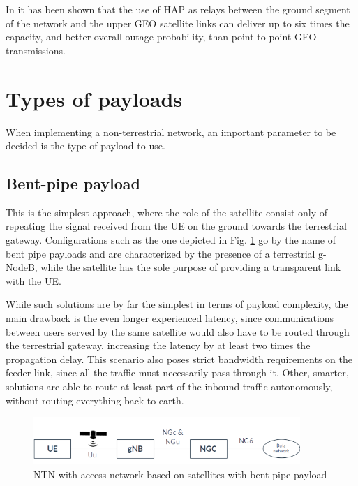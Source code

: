 In \cite{potential-multilayered-nierarchical-ntn-wang} it has been shown that the use of \ac{HAP} as relays between the ground segment of the network and the upper \ac{GEO} satellite links can deliver up to six times the capacity, and better overall outage probability, than point-to-point \ac{GEO} transmissions.


\section{Types of payloads}
When implementing a non-terrestrial network, an important parameter to be decided is the type of payload to use.

\subsection{Bent-pipe payload}
\label{sec:bent-pipe-payload}
This is the simplest approach, where the role of the satellite consist only of  repeating the signal received from the \ac{UE} on the ground towards the terrestrial gateway. Configurations such as the one depicted in Fig. \ref{fig:ntn-bent-pipe} go by the name of bent pipe payloads and are characterized by the presence of a terrestrial g-NodeB, while the satellite has the sole purpose of providing a transparent link with the \ac{UE}.

While such solutions are by far the simplest in terms of payload complexity, the main drawback is the even longer experienced latency, since communications between users served by the same satellite would also have to be routed through the terrestrial gateway, increasing the latency by at least two times the propagation delay.
This scenario also poses strict bandwidth requirements on the feeder link, since all the traffic must necessarily pass through it.
Other, smarter, solutions are able to route at least part of the inbound traffic autonomously, without routing everything back to earth.

\begin{figure}[ht]
    \centering
    \includegraphics[width=0.9\textwidth]{res/ntn-bent-pipe.png}
    \caption{NTN with access network based on satellites with bent pipe payload \cite{3gpp-tr-38.811}}
    \label{fig:ntn-bent-pipe}
\end{figure}

